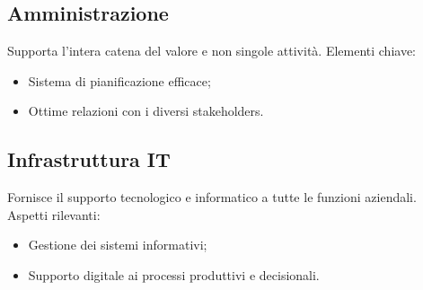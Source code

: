 \documentclass[a4paper,12pt]{article}
\begin{document}
\subsection{Amministrazione}
Supporta l’intera catena del valore e non singole attività.  
Elementi chiave:
\begin{itemize}
    \item Sistema di pianificazione efficace;
    \item Ottime relazioni con i diversi stakeholders.
\end{itemize}

\subsection{Infrastruttura IT}
Fornisce il supporto tecnologico e informatico a tutte le funzioni aziendali.  
Aspetti rilevanti:
\begin{itemize}
    \item Gestione dei sistemi informativi;
    \item Supporto digitale ai processi produttivi e decisionali.
\end{itemize}
\end{document}
